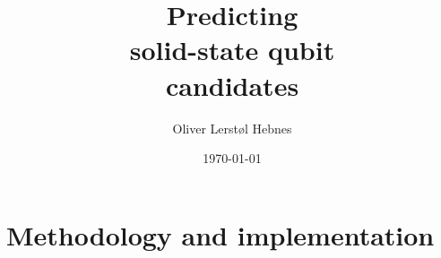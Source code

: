 \documentclass[twoside, english, notitlepage, 12pt]{uiofysmaster}
\author{Oliver Lerstøl Hebnes}
\title{Predicting\\
solid-state qubit\\
candidates
}
\date{\today}
\begin{document}
\hypersetup{pageanchor=false}
\frontmatter
    \maketitle



    \setcounter{tocdepth}{1}
    \tableofcontents

\mainmatter



    \part{Methodology and implementation}
        

\end{document}
